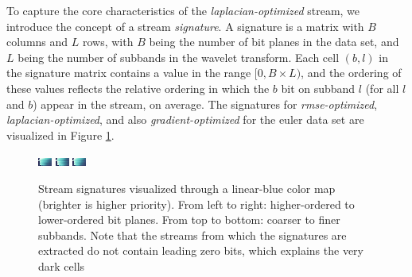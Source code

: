 To capture the core characteristics of the \emph{laplacian-optimized} stream, we introduce the
concept of a stream \emph{signature}. A signature is a matrix with $B$ columns and $L$ rows, with
$B$ being the number of bit planes in the data set, and $L$ being the number of subbands in the
wavelet transform. Each cell $(b,l)$ in the signature matrix contains a value in the range
$[0,B\times L)$, and the ordering of these values reflects the relative ordering in which the $b$
bit on subband $l$ (for all $l$ and $b$) appear in the stream, on average. The signatures for
\emph{rmse-optimized}, \emph{laplacian-optimized}, and also \emph{gradient-optimized} for the euler
data set are visualized in Figure \ref{fig:signature-comparison}. 

\begin{figure}
	\centering
	{\includegraphics[width=0.32\linewidth]{img/gradient-laplacian/SIG-GREEDY-(rmse).png}}
	{\includegraphics[width=0.32\linewidth]{img/gradient-laplacian/SIG-GREEDY-(laplacian).png}}
	{\includegraphics[width=0.32\linewidth]{img/gradient-laplacian/SIG-GREEDY-(gradient).png}}
	\caption{Stream signatures visualized through a linear-blue color map (brighter is higher
	priority). From left to right: higher-ordered to lower-ordered bit planes. From top to bottom:
	coarser to finer subbands. Note that the streams from which the signatures are extracted do not
	contain leading zero bits, which explains the very dark cells }
	\label{fig:signature-comparison}
\end{figure}

